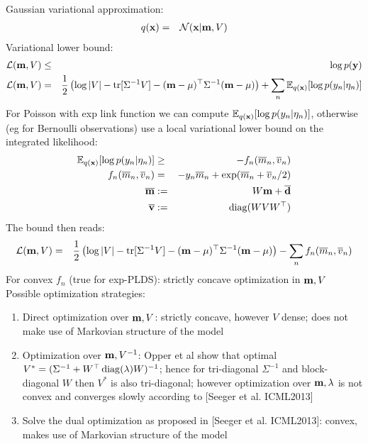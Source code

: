 \documentclass[10pt,english]{article}
\begin{document}
Gaussian variational approximation:
\begin{eqnarray}
 q(\mathbf{x})				&=&	\mathcal{N}(\mathbf{x}\vert\mathbf{m},V)
\end{eqnarray}
Variational lower bound:
\begin{eqnarray}
 \mathcal L(\mathbf{m},V)		&\leq& \log p(\mathbf{y})\\
 \mathcal L(\mathbf{m},V)		&=&	\frac{1}{2}\left(\log\vert V\vert-\operatorname{tr}[\Sigma^{-1}V]-(\mathbf{m}-\mu)^\top \Sigma^{-1}(\mathbf{m}-\mu)     \right)
					+\sum_{n} \mathbb{E}_{q(\mathbf{x})}[\log p(y_n\vert \eta_n)]
\end{eqnarray}
For Poisson with exp link function we can compute $\mathbb{E}_{q(\mathbf{x})}[\log p(y_n\vert \eta_n)]$, otherwise (eg for Bernoulli observations) use a local variational lower bound on the integrated likelihood:
\begin{eqnarray}
 \mathbb{E}_{q(\mathbf{x})}[\log p(y_n\vert \eta_n)]	&\geq& 	-f_n(\overline m_n,\overline v_n)\\
 f_n(\overline m_n,\overline v_n)	&=&	-y_n\overline m_n+\exp(\overline m_n+\overline v_n/2)\\
 \overline {\mathbf{m}}				&:=&	W\mathbf{m}+\overline{\mathbf{d}}\\
 \overline{ \mathbf{v}}			&:=&	\operatorname{diag}(WVW^\top)
\end{eqnarray}
The bound then reads:
\begin{eqnarray}
 \mathcal L(\mathbf{m},V)	&=&	\frac{1}{2}\left(\log\vert V\vert-\operatorname{tr}[\Sigma^{-1}V]-(\mathbf{m}-\mu)^\top \Sigma^{-1}(\mathbf{m}-\mu)     \right)
				-\sum_{n} f_n(\overline m_n,\overline v_n)
\end{eqnarray}
For convex $f_n$ (true for exp-PLDS): strictly concave optimization in $\mathbf{m},V$\\
Possible optimization strategies:
\begin{enumerate}
 \item Direct optimization over $\mathbf{m},V$: strictly concave, however $V$ dense; does not make use of Markovian structure of the model 
 \item Optimization over $\mathbf{m},V^{-1}$: Opper et al show that optimal $V^\ast=(\Sigma^{-1}+W^\top \operatorname{diag}(\lambda)W)^{-1}$; hence for tri-diagonal $\Sigma^{-1}$ and block-diagonal $W$ then
       $V^\ast$ is also tri-diagonal; however optimization over $\mathbf{m},\lambda$ is not convex and converges slowly according to [Seeger et al. ICML2013]
 \item Solve the dual optimization as proposed in [Seeger et al. ICML2013]: convex, makes use of Markovian structure of the model 
\end{enumerate}
\end{document}

